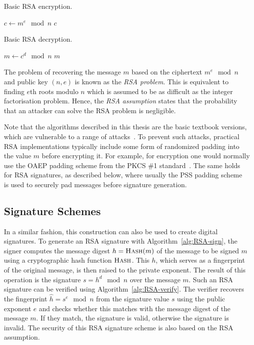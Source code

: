 \begin{algorithm}[ht]
  \caption{Basic RSA encryption.}
  \label{alg:RSA-encrypt}
  \addtolength{\baselineskip}{1mm}
  \begin{algorithmic}[1]
      \State $c \gets m^e \mod n$
      \Return $c$
    \EndFunction
  \end{algorithmic}
\end{algorithm}
\begin{algorithm}[ht]
  \caption{Basic RSA decryption.}
  \label{alg:RSA-decrypt}
  \addtolength{\baselineskip}{1mm}
  \begin{algorithmic}[1]
      \State $m \gets c^d \mod n$
      \Return $m$
    \EndFunction
  \end{algorithmic}
\end{algorithm}

The problem of recovering the message $m$ based on the ciphertext $m^e \mod n$
and public key $(n, e)$ is known as the \emph{RSA problem}.
This is equivalent to finding $e$th roots modulo $n$ which is assumed to be as
difficult as the integer factorisation problem. Hence, the \emph{RSA assumption} states that
the probability that an attacker can solve the RSA problem is negligible.

Note that the algorithms described in this thesis are the basic textbook
versions, which are vulnerable to a range of attacks~\cite{Hastad1985,
Coppersmith1997}. To prevent such attacks, practical RSA implementations
typically include some form of randomized padding into the value $m$ before
encrypting it. For example, for encryption one would normally use the OAEP
padding scheme from the PKCS \#1 standard~\cite{PKCS_1}. The same holds for RSA
signatures, as described below, where usually the PSS padding
scheme~\cite{PKCS_1} is used to securely pad messages before signature
generation.

\subsection{Signature Schemes}

In a similar fashion, this construction can also be used to create digital
signatures. To generate an RSA signature with Algorithm~\ref{alg:RSA-sign}, the
signer computes the message digest $h = \Call{Hash}{m}$ of the message to be
signed $m$ using a cryptographic hash function $\Call{Hash}{}$. This $h$, which
serves as a fingerprint of the original message, is then raised to the private
exponent. The result of this operation is the signature $s = h^d \mod n$ over
the message $m$.
Such an RSA signature can be verified using Algorithm~\ref{alg:RSA-verify}. The
verifier recovers the fingerprint $\hat{h} = s^e \mod n$ from the signature
value $s$ using the public exponent $e$ and checks whether this matches with the
message digest of the message $m$. If they match, the signature is valid,
otherwise the signature is invalid. The security of this RSA signature scheme is
also based on the RSA assumption.

